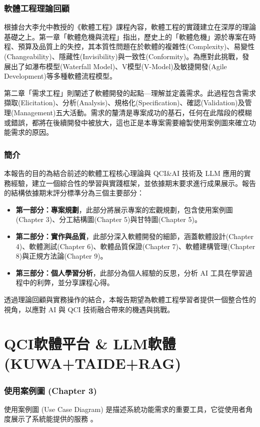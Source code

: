 \documentclass[twocolumn,11pt,a4paper]{article}
\begin{document}
\section{軟體工程理論回顧}
根據台大李允中教授的《軟體工程》課程內容，軟體工程的實踐建立在深厚的理論基礎之上。第一章「軟體危機與流程」\cite{lee2024se}指出，歷史上的「軟體危機」源於專案在時程、預算及品質上的失控，其本質性問題在於軟體的複雜性(Complexity)、易變性(Changeability)、隱藏性(Invisibility)與一致性(Conformity)。為應對此挑戰，發展出了如瀑布模型(Waterfall Model)、V模型(V-Model)及敏捷開發(Agile Development)等多種軟體流程模型。

第二章「需求工程」\cite{lee2024se}則闡述了軟體開發的起點—理解並定義需求。此過程包含需求擷取(Elicitation)、分析(Analysis)、規格化(Specification)、確認(Validation)及管理(Management)五大活動。需求的釐清是專案成功的基石，任何在此階段的模糊或錯誤，都將在後續開發中被放大，這也正是本專案需要繪製使用案例圖來確立功能需求的原因。

\section{簡介}
本報告的目的為結合前述的軟體工程核心理論與 QCI\&AI 技術及 LLM 應用的實務經驗，建立一個綜合性的學習與實踐框架，並依據期末要求進行成果展示。報告的結構依據期末評分標準分為三個主要部分：
\begin{itemize}
    \item \textbf{第一部分：專案規劃}，此部分將展示專案的宏觀規劃，包含使用案例圖(Chapter 3)、分工結構圖(Chapter 5)與甘特圖(Chapter 5)。
    \item \textbf{第二部分：實作與品質}，此部分深入軟體開發的細節，涵蓋軟體設計(Chapter 4)、軟體測試(Chapter 6)、軟體品質保證(Chapter 7)、軟體建構管理(Chapter 8)與正規方法論(Chapter 9)。
    \item \textbf{第三部分：個人學習分析}，此部分為個人經驗的反思，分析 AI 工具在學習過程中的利弊，並分享課程心得。
\end{itemize}
透過理論回顧與實務操作的結合，本報告期望為軟體工程學習者提供一個整合性的視角，以應對 AI 與 QCI 技術融合帶來的機遇與挑戰。


\part{QCI軟體平台 \& LLM軟體(KUWA+TAIDE+RAG)}

\section{使用案例圖 (Chapter 3)}
使用案例圖 (Use Case Diagram) 是描述系統功能需求的重要工具，它從使用者角度展示了系統能提供的服務 \cite{lee2024se}。
\end{document}

